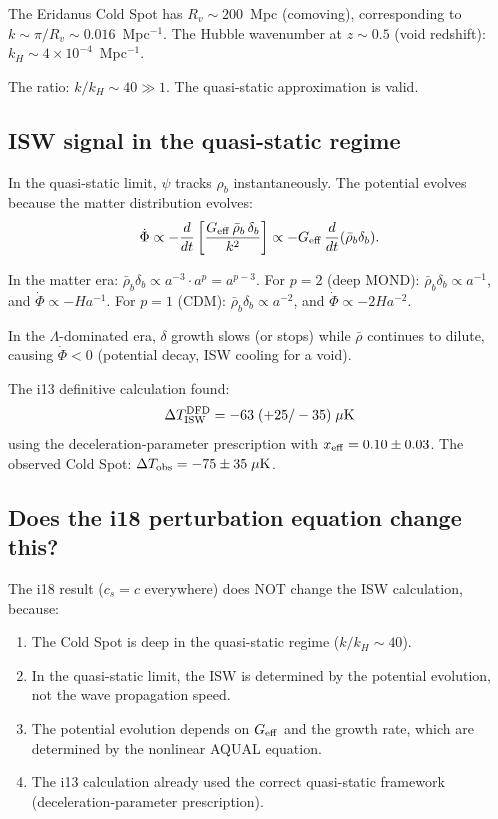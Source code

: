 \documentclass[11pt]{article}
\newcommand{\ee}[1]{\times 10^{#1}}
\newcommand{\Geff}{G_{\rm eff}}
\begin{document}
The Eridanus Cold Spot has $R_v \sim 200$~Mpc (comoving), corresponding
to $k \sim \pi/R_v \sim 0.016$~Mpc$^{-1}$. The Hubble wavenumber at
$z \sim 0.5$ (void redshift): $k_H \sim 4\ee{-4}$~Mpc$^{-1}$.

The ratio: $k/k_H \sim 40 \gg 1$. The quasi-static approximation is valid.

\subsection{ISW signal in the quasi-static regime}

In the quasi-static limit, $\psi$ tracks $\rho_b$ instantaneously.
The potential evolves because the matter distribution evolves:
\begin{equation}
\dot\Phi \propto -\frac{d}{dt}\left[\frac{\Geff\,\bar\rho_b\,\delta_b}{k^2}\right]
\propto -\Geff\,\frac{d}{dt}(\bar\rho_b\delta_b).
\end{equation}

In the matter era: $\bar\rho_b\delta_b \propto a^{-3}\cdot a^p = a^{p-3}$.
For $p = 2$ (deep MOND): $\bar\rho_b\delta_b \propto a^{-1}$, and
$\dot\Phi \propto -Ha^{-1}$. For $p = 1$ (CDM): $\bar\rho_b\delta_b
\propto a^{-2}$, and $\dot\Phi \propto -2Ha^{-2}$.

In the $\Lambda$-dominated era, $\delta$ growth slows (or stops)
while $\bar\rho$ continues to dilute, causing $\dot\Phi < 0$ (potential
decay, ISW cooling for a void).

The i13 definitive calculation found:
\begin{equation}
\Delta T_{\rm ISW}^{\rm DFD} = -63\;(+25/-35)\;\mu\text{K}
\end{equation}
using the deceleration-parameter prescription with $x_{\rm eff} = 0.10
\pm 0.03$. The observed Cold Spot: $\Delta T_{\rm obs} = -75\pm 35\;\mu\text{K}$.

\subsection{Does the i18 perturbation equation change this?}

The i18 result ($c_s = c$ everywhere) does NOT change the ISW
calculation, because:

\begin{enumerate}
\item The Cold Spot is deep in the quasi-static regime ($k/k_H \sim 40$).
\item In the quasi-static limit, the ISW is determined by the potential
  evolution, not the wave propagation speed.
\item The potential evolution depends on $\Geff$ and the growth rate,
  which are determined by the nonlinear AQUAL equation.
\item The i13 calculation already used the correct quasi-static framework
  (deceleration-parameter prescription).
\end{enumerate}
\end{document}
